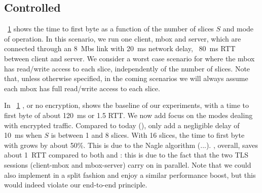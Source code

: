 \documentclass{article}
\begin{document}

\newpage
\subsection{Controlled}

\begin{figure}[t]
\centering
{}
\label{fig:eval_1}
\end{figure}

\fig~\ref{fig:eval_1} shows the time to first byte as a function of
the number of slices $S$ and mode of operation. In this scenario, we
run one client, mbox and server, which are connected through an 8~Mbs
link with 20~ms network delay, \ie~80~ms RTT between client and
server. We consider a worst case scenario for \sppmode where the mbox
has read/write access to each slice, independently of the number of
slices. Note that, unless otherwise specified, in the coming scenarios
we will always assume each mbox has full read/write access to each
slice.

In \fig~\ref{fig:eval_1} \tcpmode, or no encryption, shows the
baseline of our experiments, with a time to first byte of about 120~ms
or 1.5 RTT. We now add focus on the modes dealing with encrypted
traffic. Compared to today (\etemode), \sppmode only add a negligible
delay of 10~ms when $S$ is between 1 and 8 slices. With 16 slices, the
time to first byte with \sppmode grows by about 50\%. This is due to
the Nagle algorithm (...). \splitmode, overall, saves about 1~RTT
compared to both \sppmode and \tcpmode: this is due to the fact that
the two TLS sessions (client-mbox and mbox-server) carry on in
parallel. Note that we could also implement \sppmode in a split
fashion and enjoy a similar performance boost, but this would indeed
violate our end-to-end principle.


\\
\\


\newpage
\begin{figure}[!htbp]
\centering
{}
\label{fig:eval_2}
\end{figure}
\end{document}
